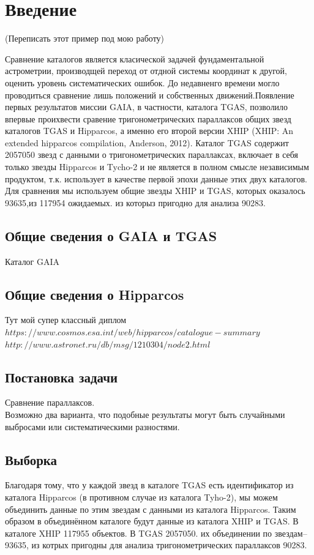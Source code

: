 \documentclass[14pt]{article} %
\begin{document}
 
\section{Введение}\label{introduction}

(Переписать этот пример под мою работу)


Сравнение каталогов является класической задачей фундаментальной\\ астрометрии, производщей переход от отдной системы координат к другой, оценить уровень систематических ошибок. До недавненго времени могло проводиться сравнение лишь положений и собственных движений.Появление первых результатов миссии GAIA, в частности, каталога TGAS, позволило впервые проихвести сравение тригонометрических параллаксов общих звезд каталогов TGAS и  Hipparcos, а именно его второй версии XHIP (XHIP: An extended hipparcos compilation, Anderson, 2012). Каталог TGAS содержит 2057050 звезд с данными о тригонометрических параллаксах, включает в себя только звезды Hipparcos и Tycho-2  и не является в полном смысле независимым продуктом, т.к. использует в качестве первой эпохи данные этих двух каталогов. Для сравнения мы используем общие звезды XHIP  и TGAS, которых оказалось 93635,из 117954 ожидаемых. из которыз пригодно для анализа 90283.

\subsection{Общие сведения о GAIA и TGAS}\label{sub:smthgaia}
Каталог GAIA
		
\subsection{Общие сведения о Hipparcos}\label{sub:smthhip}
 Тут мой супер классный диплом
$https://www.cosmos.esa.int/web/hipparcos/catalogue-summary$
$http://www.astronet.ru/db/msg/1210304/node2.html$

\subsection{Постановка задачи}\label{sub:smthzd}
	Сравнение параллаксов.\\
Возможно два варианта, что подобные результаты могут быть случайными выбросами или систематическими разностями.

\subsection{Выборка}\label{sub:smthzd}
Благодаря тому, что у каждой звезд в каталоге TGAS есть идентификатор из каталога Hipparcos (в противном случае из каталога Tyho-2), мы можем объединить данные по этим звездам с данными из каталога Hipparcos. Таким образом в объединённом каталоге будут данные из каталога XHIP и TGAS. В каталоге XHIP 117955 объектов. В TGAS 2057050. их объединении по звездам-- 93635, из котрых пригодны для анализа тригонометрических параллаксов  90283.
\end{document}
